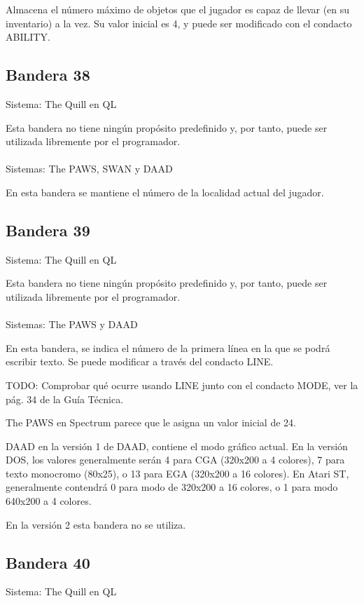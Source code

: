 \documentclass[11pt, a5paper]{article}
\newcommand{\quill}{\textsf{The Quill}\xspace}
\newcommand{\paw}{\textsf{The PAWS}\xspace}
\newcommand{\swan}{\textsf{SWAN}\xspace}
\newcommand{\daad}{\textsf{DAAD}\xspace}
\newcommand{\sistema}[1]{\noindent Sistema: #1 \nopagebreak}
\newcommand{\sistemas}[1]{\noindent Sistemas: #1 \nopagebreak}
\begin{document}
Almacena el número máximo de objetos que el jugador es capaz de llevar (en su inventario) a la vez. Su valor inicial es 4, y puede ser modificado con el condacto ABILITY.

\subsection{Bandera 38}

\sistema{\quill en QL}

Esta bandera no tiene ningún propósito predefinido y, por tanto, puede ser utilizada libremente por el programador.
\\\ \\
\sistemas{\paw, \swan y \daad}

En esta bandera se mantiene el número de la localidad actual del jugador.

\subsection{Bandera 39}

\sistema{\quill en QL}

Esta bandera no tiene ningún propósito predefinido y, por tanto, puede ser utilizada libremente por el programador.
\\\ \\
\sistemas{\paw y \daad}

En esta bandera, se indica el número de la primera línea en la que se podrá escribir texto. Se puede modificar a través del condacto LINE.

TODO: Comprobar qué ocurre usando LINE junto con el condacto MODE, ver la pág. 34 de la Guía Técnica.

\paw en Spectrum parece que le asigna un valor inicial de 24.

\daad en la versión 1 de \daad, contiene el modo gráfico actual. En la versión DOS, los valores generalmente serán 4 para CGA (320x200 a 4 colores), 7 para texto monocromo (80x25), o 13 para EGA (320x200 a 16 colores). En Atari ST, generalmente contendrá 0 para modo de 320x200 a 16 colores, o 1 para modo 640x200 a 4 colores.

En la versión 2 esta bandera no se utiliza.

\subsection{Bandera 40}

\sistema{\quill en QL}
\end{document}
